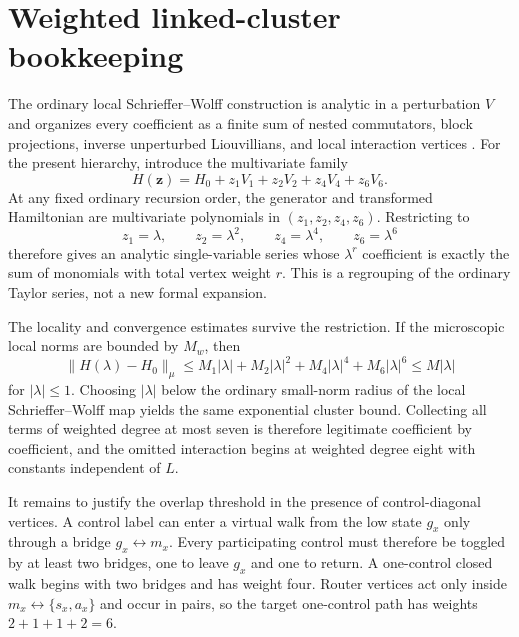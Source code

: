 \documentclass[11pt]{article}
\theoremstyle{definition}
\theoremstyle{remark}
\newcommand{\norm}[1]{\lVert #1\rVert}
\begin{document}
\section{Weighted linked-cluster bookkeeping}
\label{app:weighted}

The ordinary local Schrieffer--Wolff construction is analytic in a perturbation $V$ and organizes every coefficient as a finite sum of nested commutators, block projections, inverse unperturbed Liouvillians, and local interaction vertices \cite{Bravyi2011}.  For the present hierarchy, introduce the multivariate family
\begin{equation}
 H(\mathbf z)=H_0+z_1V_1+z_2V_2+z_4V_4+z_6V_6.
 \label{eq:multivariate-SW}
\end{equation}
At any fixed ordinary recursion order, the generator and transformed Hamiltonian are multivariate polynomials in $(z_1,z_2,z_4,z_6)$.  Restricting to
\begin{equation}
 z_1=\lambda,
 \qquad z_2=\lambda^2,
 \qquad z_4=\lambda^4,
 \qquad z_6=\lambda^6
\end{equation}
therefore gives an analytic single-variable series whose $\lambda^r$ coefficient is exactly the sum of monomials with total vertex weight $r$.  This is a regrouping of the ordinary Taylor series, not a new formal expansion.

The locality and convergence estimates survive the restriction.  If the microscopic local norms are bounded by $M_w$, then
\begin{equation}
 \norm{H(\lambda)-H_0}_\mu
 \le M_1|\lambda|+M_2|\lambda|^2+M_4|\lambda|^4+M_6|\lambda|^6
 \le M|\lambda|
\end{equation}
for $|\lambda|\le1$.  Choosing $|\lambda|$ below the ordinary small-norm radius of the local Schrieffer--Wolff map yields the same exponential cluster bound.  Collecting all terms of weighted degree at most seven is therefore legitimate coefficient by coefficient, and the omitted interaction begins at weighted degree eight with constants independent of $L$.

It remains to justify the overlap threshold in the presence of control-diagonal vertices.  A control label can enter a virtual walk from the low state $g_x$ only through a bridge $g_x\leftrightarrow m_x$.  Every participating control must therefore be toggled by at least two bridges, one to leave $g_x$ and one to return.  A one-control closed walk begins with two bridges and has weight four.  Router vertices act only inside $m_x\leftrightarrow\{s_x,a_x\}$ and occur in pairs, so the target one-control path has weights $2+1+1+2=6$.
\end{document}
